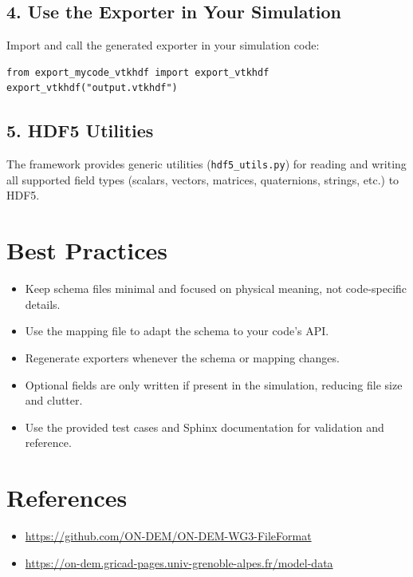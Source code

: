 \documentclass[11pt]{article}
\begin{document}
\subsection{4. Use the Exporter in Your Simulation}

Import and call the generated exporter in your simulation code:

\begin{verbatim}
from export_mycode_vtkhdf import export_vtkhdf
export_vtkhdf("output.vtkhdf")
\end{verbatim}

\subsection{5. HDF5 Utilities}

The framework provides generic utilities (\texttt{hdf5\_utils.py}) for reading and writing all supported field types (scalars, vectors, matrices, quaternions, strings, etc.) to HDF5.

\section{Best Practices}

\begin{itemize}
    \item Keep schema files minimal and focused on physical meaning, not code-specific details.
    \item Use the mapping file to adapt the schema to your code's API.
    \item Regenerate exporters whenever the schema or mapping changes.
    \item Optional fields are only written if present in the simulation, reducing file size and clutter.
    \item Use the provided test cases and Sphinx documentation for validation and reference.
\end{itemize}

\section{References}

\begin{itemize}
    \item \url{https://github.com/ON-DEM/ON-DEM-WG3-FileFormat}
    \item \url{https://on-dem.gricad-pages.univ-grenoble-alpes.fr/model-data}
\end{itemize}
\end{document}
